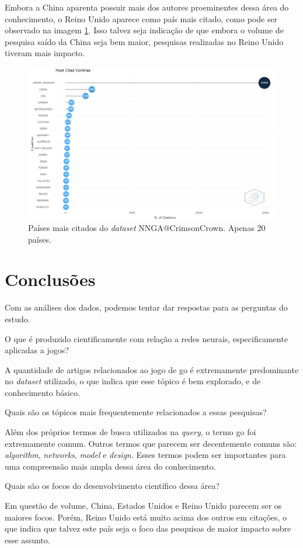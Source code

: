 Embora a China aparenta possuir mais dos autores proeminentes dessa área do conhecimento, o Reino Unido aparece como país mais citado, como pode ser observado na imagem \ref{fig:CrimsonCrown:NNGA:MostCitedCountries}. Isso talvez seja indicação de que embora o volume de pesquisa saído da China seja bem maior, pesquisas realizadas no Reino Unido tiveram mais impacto.

\begin{figure}
    \centering
    \includegraphics[angle=0,width=1\textwidth,height=0.5\textheight]{experiments/CrimsonCrown/AnaliseBibliometrica/RedesNeuraisJogos/NNGAMCC.png}
    \caption{Países mais citados do \textit{dataset} NNGA@CrimsonCrown. Apenas 20 países.}
    \label{fig:CrimsonCrown:NNGA:MostCitedCountries}
\end{figure}

\section{Conclusões}

Com as análises dos dados, podemos tentar dar respostas para as perguntas do estudo.

O que é produzido cientificamente com relação a redes neurais, especificamente aplicadas a jogos?

A quantidade de artigos relacionados ao jogo de go é extremamente predominante no \textit{dataset} utilizado, o que indica que esse tópico é bem explorado, e de conhecimento básico.

Quais são os tópicos mais frequentemente relacionados a essas pesquisas?

Além dos próprios termos de busca utilizados na \textit{query}, o termo go foi extremamente comum. Outros termos que parecem ser decentemente comuns são: \textit{algorithm}, \textit{networks}, \textit{model} e \textit{design}. Esses termos podem ser importantes para uma compreensão mais ampla dessa área do conhecimento.

Quais são os focos do desenvolvimento científico dessa área?

Em questão de volume, China, Estados Unidos e Reino Unido parecem ser os maiores focos. Porém, Reino Unido está muito acima dos outros em citações, o que indica que talvez este país seja o foco das pesquisas de maior impacto sobre esse assunto. 